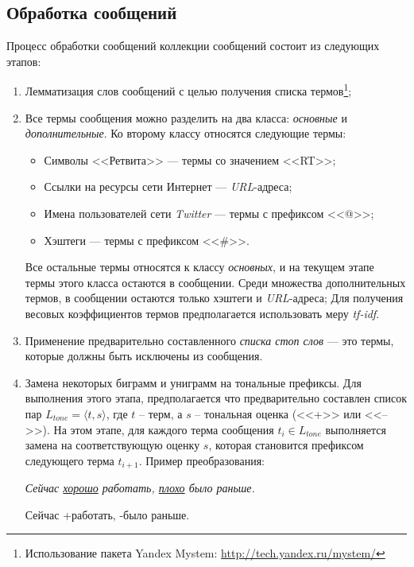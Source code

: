     \subsection{Обработка сообщений}
    \label{sec:buildingMsgProcessing}
    Процесс обработки сообщений коллекции сообщений состоит из следующих этапов:
    \begin{enumerate}
        \item Лемматизация слов сообщений с целью получения списка термов\footnote{
            Использование пакета Yandex Mystem:
            \url{http://tech.yandex.ru/mystem/}
            };

        \item Все термы сообщения можно разделить на два класса: {\it основные} и
            {\it дополнительные}.
            Ко второму классу относятся следующие термы:
            \begin{itemize}
                \item Символы <<Ретвита>> --- термы со значением <<RT>>;
                \item Ссылки на ресурсы сети Интернет --- {\it URL\hspace{1pt}}-адреса;
                \item Имена пользователей сети {\it Twitter} --- термы с префиксом <<@>>;
                \item Хэштеги --- термы с префиксом <<\#>>.
            \end{itemize}
            Все остальные термы относятся к классу {\it основных}, и на текущем этапе
            термы этого класса остаются в сообщении. Среди множества дополнительных
            термов, в сообщении остаются только хэштеги и {\it URL\hspace{1pt}}-адреса;
            Для получения весовых коэффициентов термов предполагается использовать меру {\it tf-idf}.

        \item Применение предварительно составленного {\it списка стоп слов} ---
            это термы, которые должны быть исключены из сообщения.
        \item Замена некоторых биграмм и униграмм на тональные префиксы.
            Для выполнения этого этапа, предполагается что предварительно составлен
            список пар $L_{tone} = {\langle t, s\rangle}$, где $t$ -- терм, а $s$ --
            тональная оценка (<<+>> или <<-->>). На этом этапе, для каждого терма сообщения $t_i \in L_{tone}$
            выполняется замена на соответствующую оценку $s$, которая становится префиксом
            следующего терма $t_{i+1}$. Пример преобразования:
            \begin{center}
                \it
                Сейчас \underline{хорошо} работать, \underline{плохо} было раньше.

                Сейчас +работать, -было раньше.
            \end{center}
    \end{enumerate}

